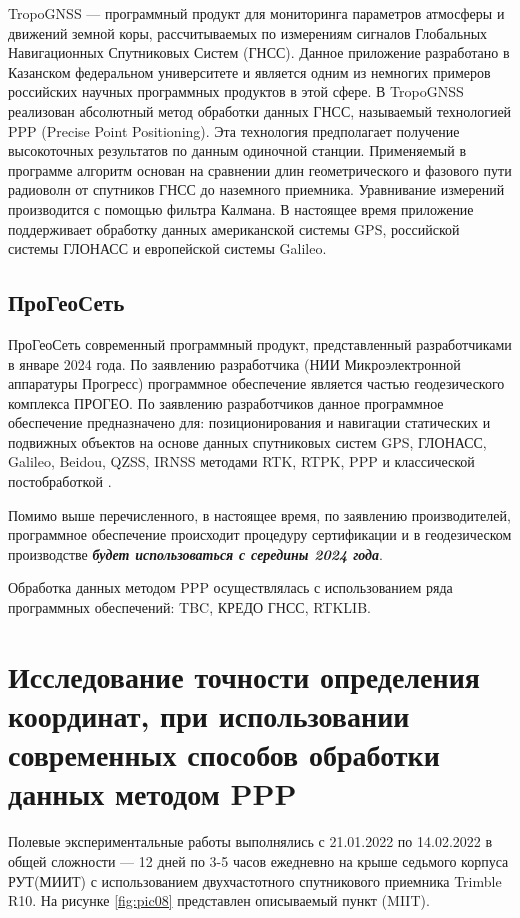 TropoGNSS --- программный продукт для мониторинга параметров атмосферы и движений земной коры, рассчитываемых по измерениям сигналов Глобальных Навигационных Спутниковых Систем (ГНСС). Данное приложение разработано в Казанском федеральном университете и является одним из немногих примеров российских научных программных продуктов в этой сфере. В TropoGNSS реализован абсолютный метод обработки данных ГНСС, называемый технологией PPP (Precise Point Positioning). Эта технология предполагает получение высокоточных результатов по данным одиночной станции. Применяемый в программе алгоритм основан на сравнении длин геометрического и фазового пути радиоволн от спутников ГНСС до наземного приемника. Уравнивание измерений производится с помощью фильтра Калмана. В настоящее время приложение поддерживает обработку данных американской системы GPS, российской системы ГЛОНАСС и европейской системы Galileo.

\subsection{ПроГеоСеть}\label{subsec:ch2/sec2/sub8}

ПроГеоСеть современный программный продукт, представленный разработчиками в январе 2024 года. По заявлению разработчика (НИИ Микроэлектронной аппаратуры Прогресс) программное обеспечение является частью геодезического комплекса ПРОГЕО. По заявлению разработчиков данное программное обеспечение предназначено для: позиционирования и навигации статических и подвижных объектов на основе данных спутниковых систем GPS, ГЛОНАСС, Galileo, Beidou, QZSS, IRNSS методами RTK, RTPK, PPP и классической постобработкой \cite{src36}.

Помимо выше перечисленного, в настоящее время, по заявлению производителей, программное обеспечение происходит процедуру сертификации и в геодезическом производстве \textbf{\textit{будет использоваться с середины 2024 года}}.

Обработка данных методом PPP осуществлялась с использованием ряда программных обеспечений: TBC, КРЕДО ГНСС, RTKLIB.


\section{Исследование точности определения координат, при использовании современных способов обработки данных методом PPP}\label{sec:ch2/sec3}

Полевые экспериментальные работы выполнялись с 21.01.2022 по 14.02.2022 в общей сложности --- 12 дней по 3-5 часов ежедневно на крыше седьмого корпуса РУТ(МИИТ) с использованием двухчастотного спутникового приемника Trimble R10. На рисунке \cref{fig:pic08} представлен описываемый пункт (MIIT).

